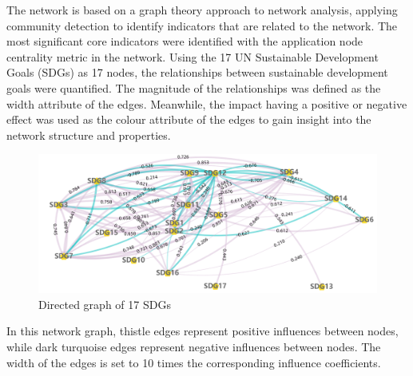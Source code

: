 \documentclass[10pt]{mcmthesis}
\begin{document}
The network is based on a graph theory approach\cite{beineke1997graph} to network analysis, applying community detection to identify indicators that are related to the network. The most significant core indicators were identified with the application node centrality metric in the network. Using the 17 UN Sustainable Development Goals (SDGs) as 17 nodes, the relationships between sustainable development goals were quantified. The magnitude of the relationships was defined as the width attribute of the edges. Meanwhile, the impact having a positive or negative effect was used as the colour attribute of the edges to gain insight into the network structure and properties.



\begin{figure}[H]
    \centering
    \includegraphics[width=14.0cm]{figures/modify_map.png}
    \caption{ Directed graph of 17 SDGs }%
    \label{fig.graph}
\end{figure} 
\vspace{-15pt}

In this network graph, thistle edges represent positive influences between nodes, while dark turquoise edges represent negative influences between nodes. The width of the edges is set to 10 times the corresponding influence coefficients.




\end{document}

